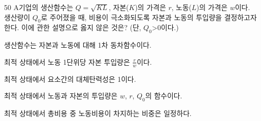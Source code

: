 \begin{question}{50}
A기업의 생산함수는 $Q= \sqrt { KL }$, 자본($K$)의 가격은 $r$, 노동($L$)의 가격은 $w$이다. 생산량이 $Q_{ 0 }$로 주어졌을 때, 비용이 극소화되도록 자본과 노동의 투입량을 결정하고자 한다. 이에 관한 설명으로 옳지 않은 것은? (단, $Q_{ 0 }$>0이다.)
\begin{choices}
  \item 생산함수는 자본과 노동에 대해 1차 동차함수이다.
  \item 최적 상태에서 노동 1단위당 자본 투입량은 $\frac{ r } { w }$이다.
  \item 최적 상태에서 요소간의 대체탄력성은 1이다.
  \item 최적 상태에서 노동과 자본의 투입량은 $w$, $r$, $Q_{ 0 }$의 함수이다.
  \item 최적 상태에서 총비용 중 노동비용이 차지하는 비중은 일정하다.
\end{choices}
\end{question}
